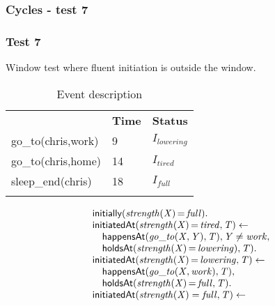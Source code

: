 \documentclass[8pt]{beamer}
\DeclareMathOperator{\val}{=}  %
\def \patsize {}
\def\happensAt{\textsf{\patsize happensAt}}
\def\initially{\textsf{\patsize initially}}
\def\holdsAt{\textsf{\patsize holdsAt}}
\def\initiatedAt{\textsf{\patsize initiatedAt}}
\newenvironment{mysplit}%
  {\arraycolsep 0pt \begin{array}{l}}%
  {\end{array}}
\begin{document}
\begin{frame}
    \frametitle{Cycles - test 7}
    \subsubsection{Test 7}
    \small
    Window test where fluent initiation is outside the window.\linebreak
    \begin{minipage}{0.4\linewidth}
        \begin{table}[t!]
            \caption{Event description}
            \begin{center}

                \begin{tabular}{lll}
                    \hline\noalign{\smallskip}
                    \multicolumn{1}{l}{\textbf{Event}} & \multicolumn{1}{c}{\textbf{Time}} & \multicolumn{1}{c}{\textbf{Status}} \\
                    go\_to(chris,work)& 9 & $I_{lowering}$\\
                    go\_to(chris,home)& 14 & $I_{tired}$\\
                    sleep\_end(chris)& 18 & $I_{full}$\\
                    \noalign{\smallskip}
                    \hline
                \end{tabular}
            \end{center}
        \end{table}
    \end{minipage}
    \begin{minipage}{0.55\linewidth}
        \begin{align*}
            \begin{mysplit}
                \initially\mathit{(strength(X)\val full)}.\\
                \initiatedAt\mathit{(strength(X)\val tired,T)\leftarrow}\\
                \quad    \happensAt\mathit{(go\_to(X,Y),T),Y\neq work,}\\
                \quad    \holdsAt\mathit{(strength(X)\val lowering),T).}\\
                \initiatedAt\mathit{(strength(X)\val lowering,T)\leftarrow}\\
                \quad    \happensAt\mathit{(go\_to(X,work),T),}\\
                \quad    \holdsAt\mathit{(strength(X)\val full,T).}\\
                \initiatedAt\mathit{(strength(X)=full,T)\leftarrow}\\

\end{mysplit}
\end{align*}
\end{minipage}
\end{frame}
\end{document}
